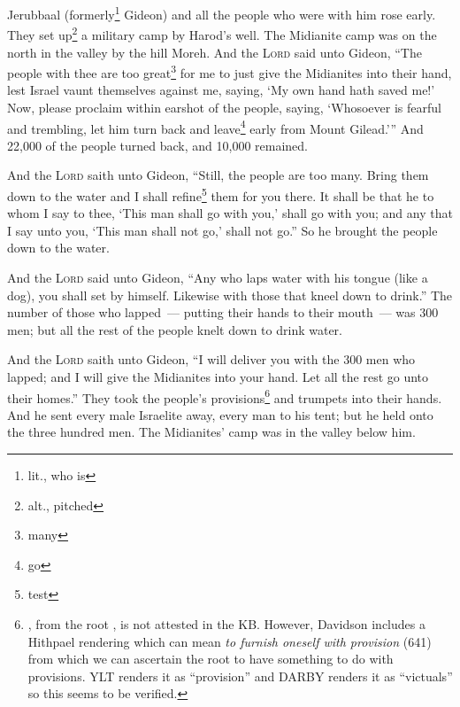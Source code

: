 
\begin{inparaenum}
     Jerubbaal (formerly\footnote{lit., who is} Gideon) and all the people who were with him rose early. They set up\footnote{alt., pitched} a military camp by Harod's well. The Midianite camp was on the north in the valley by the hill Moreh.%
     And the \textsc{Lord} said unto Gideon, ``The people with thee are too great\footnote{many} for me to just give the Midianites into their hand, lest Israel vaunt themselves against me, saying, `My own hand hath saved me!'%
     Now, please proclaim within earshot of the people, saying, `Whosoever is fearful and trembling, let him turn back and leave\footnote{go} early from Mount Gilead.'\thinspace'' And 22,000 of the people turned back, and 10,000 remained.%
    
     And the \textsc{Lord} saith unto Gideon, ``Still, the people are too many. Bring them down to the water and I shall refine\footnote{test} them for you there. It shall be that he to whom I say to thee, `This man shall go with you,' shall go with you; and any that I say unto you, `This man shall not go,' shall not go.''%
     So he brought the people down to the water.
    
    And the \textsc{Lord} said unto Gideon, ``Any who laps water with his tongue (like a dog), you shall set by himself. Likewise with those that kneel down to drink.''%
     The number of those who lapped~--- putting their hands to their mouth~--- was 300 men; but all the rest of the people knelt down to drink water.%
    
     And the \textsc{Lord} saith unto Gideon, ``I will deliver you with the 300 men who lapped; and I will give the Midianites into your hand. Let all the rest go unto their homes.''%
     They took the people's provisions\footnote{, from the root , is not attested in the KB. However, Davidson includes a Hithpael rendering which can mean \textit{to furnish oneself with provision} (641) from which we can ascertain the root to have something to do with provisions. YLT renders it as ``provision'' and DARBY renders it as ``victuals'' so this seems to be verified.} and trumpets into their hands. And he sent every male Israelite away, every man to his tent; but he held onto the three hundred men. The Midianites' camp was in the valley below him.%
    

\end{inparaenum}
